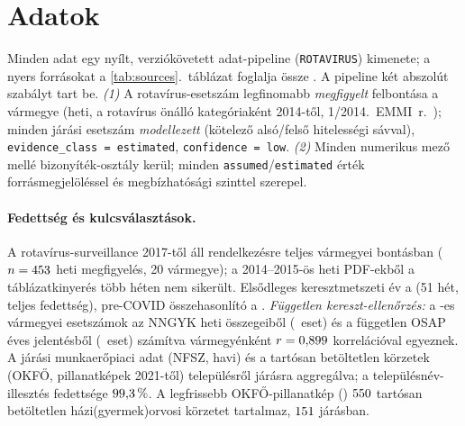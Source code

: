 \documentclass[12pt,a4paper]{article}
\begin{document}
\section{Adatok}

Minden adat egy nyílt, verziókövetett adat-pipeline (\texttt{ROTAVIRUS})
kimenete; a nyers forrásokat a \ref{tab:sources}.~táblázat foglalja össze
\citep{nngyk_epinfo,nngyk_osap,nfsz_stat,okfo_korzet,ksh_stadat,ksh_nepszamlalas}.
A pipeline két abszolút szabályt tart be. \emph{(1)} A rotavírus-esetszám
legfinomabb \emph{megfigyelt} felbontása a vármegye (heti, a rotavírus önálló
kategóriaként 2014-től, 1/2014.~EMMI~r.\ \citep{emmi12014}); minden járási
esetszám \emph{modellezett} (kötelező alsó/felső hitelességi sávval),
\texttt{evidence\_class = estimated}, \texttt{confidence = low}. \emph{(2)}
Minden numerikus mező mellé bizonyíték-osztály kerül; minden
\texttt{assumed}/\texttt{estimated} érték forrásmegjelöléssel és
megbízhatósági szinttel szerepel.



\paragraph{Fedettség és kulcsválasztások.}
A rotavírus-surveillance 2017-től áll rendelkezésre teljes vármegyei
bontásban ($n=453$ heti megfigyelés, 20 vármegye); a 2014--2015-ös
heti PDF-ekből a táblázatkinyerés több héten nem sikerült. Elsődleges
keresztmetszeti év a \csYear{} (51 hét, teljes fedettség), pre-COVID
összehasonlító a \preYear{}. \emph{Független kereszt-ellenőrzés:} a
\csYear-es vármegyei esetszámok az NNGYK heti összegeiből
(\weeklySumTotal{}~eset) és a független OSAP éves jelentésből
(\osapTotal{}~eset) számítva vármegyénként $r=0{,}899$
korrelációval egyeznek. A járási munkaerőpiaci adat (NFSZ, havi) és a
tartósan betöltetlen körzetek (OKFŐ, pillanatképek 2021-től) településről
járásra aggregálva; a településnév-illesztés fedettsége $99{,}3\,\%$.
A legfrissebb OKFŐ-pillanatkép (\okfoSnapshot) $550{}$ tartósan
betöltetlen házi(gyermek)orvosi körzetet tartalmaz,
$151{}$ járásban.
\end{document}
